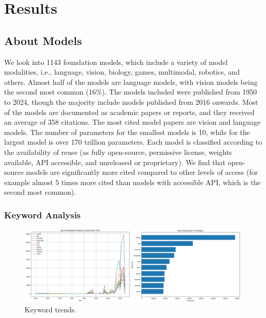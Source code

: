 \documentclass[acmsmall,authorversion]{acmart}
\begin{document}

\section{Results} 

\subsection{About Models}

We look into 1143 foundation models, which include a variety of model modalities, i.e., language, vision, biology, games, multimodal, robotics, and others. Almost half of the models are language models, with vision models being the second most common (16\%). The models included were published from 1950 to 2024, though the majority include models published from 2016 onwards. Most of the models are documented as academic papers or reports, and they received an average of 358 citations. The most cited model papers are vision and language models. The number of parameters for the smallest models is 10, while for the largest model is over 170 trillion parameters. Each model is classified according to the availability of reuse (as fully open-source, permissive license, weights available, API accessible, and unreleased or proprietary). We find that open-source models are significantly more cited compared to other levels of access (for example almost 5 times more cited than models with accessible API, which is the second most common).

\subsubsection{Keyword Analysis}


\begin{figure}
    \centering
    \includegraphics[width=\linewidth]{../figures/new_keyword.png}
    \caption{Keyword trends.}
    \label{fig:keyword-frequencies}
\end{figure}
\end{document}
